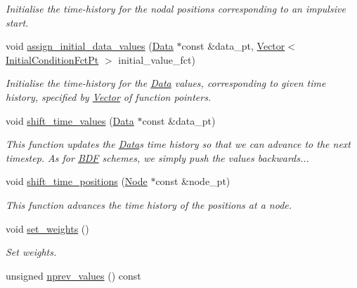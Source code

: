 \begin{DoxyCompactItemize}
\begin{DoxyCompactList}\small\item\em Initialise the time-\/history for the nodal positions corresponding to an impulsive start. \end{DoxyCompactList}\item 
void \hyperlink{classoomph_1_1Steady_a9598718f5a8ab37a123fb183ba4b8bf9}{assign\+\_\+initial\+\_\+data\+\_\+values} (\hyperlink{classoomph_1_1Data}{Data} $\ast$const \&data\+\_\+pt, \hyperlink{classoomph_1_1Vector}{Vector}$<$ \hyperlink{classoomph_1_1Steady_a107849d71562b3efa4bf785de60490b3}{Initial\+Condition\+Fct\+Pt} $>$ initial\+\_\+value\+\_\+fct)
\begin{DoxyCompactList}\small\item\em Initialise the time-\/history for the \hyperlink{classoomph_1_1Data}{Data} values, corresponding to given time history, specified by \hyperlink{classoomph_1_1Vector}{Vector} of function pointers. \end{DoxyCompactList}\item 
void \hyperlink{classoomph_1_1Steady_aa1c00b0014a2394f7b2e1b302ebbce00}{shift\+\_\+time\+\_\+values} (\hyperlink{classoomph_1_1Data}{Data} $\ast$const \&data\+\_\+pt)
\begin{DoxyCompactList}\small\item\em This function updates the \hyperlink{classoomph_1_1Data}{Data}\textquotesingle{}s time history so that we can advance to the next timestep. As for \hyperlink{classoomph_1_1BDF}{B\+DF} schemes, we simply push the values backwards... \end{DoxyCompactList}\item 
void \hyperlink{classoomph_1_1Steady_a4b3c9877146cb5a3673b54e0f02d9625}{shift\+\_\+time\+\_\+positions} (\hyperlink{classoomph_1_1Node}{Node} $\ast$const \&node\+\_\+pt)
\begin{DoxyCompactList}\small\item\em This function advances the time history of the positions at a node. \end{DoxyCompactList}\item 
void \hyperlink{classoomph_1_1Steady_a2a00515fba0cfe35d486ea2bbb5af99c}{set\+\_\+weights} ()
\begin{DoxyCompactList}\small\item\em Set weights. \end{DoxyCompactList}\item 
unsigned \hyperlink{classoomph_1_1Steady_acb34aea820a95d50b4dd7a8e92bea91a}{nprev\+\_\+values} () const

\end{DoxyCompactItemize}
